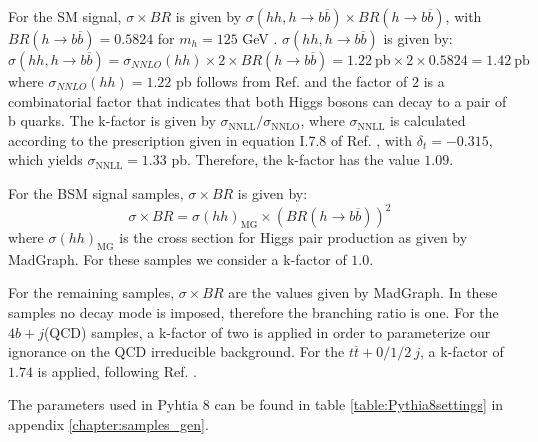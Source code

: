 For the SM signal, $\sigma\times BR$ is given by $\sigma(hh,h\rightarrow b\overline{b})\times BR(h\rightarrow b\overline{b})$, with $BR(h\rightarrow b\overline{b})=0.5824$ for $m_h=125$ GeV \cite{HiggsHandbook}. $\sigma(hh,h\rightarrow b\overline{b})$ is given by:
\begin{equation}
	\sigma(hh,h\rightarrow b\overline{b})=\sigma_{NNLO}(hh)\times 2\times BR(h\rightarrow b\overline{b})=1.22~\text{pb}\times 2 \times 0.5824 = 1.42 ~\text{pb}
\end{equation}
where $\sigma_{NNLO}(hh)=1.22$ pb follows from Ref. \cite{HxsNNLO} and the factor of $2$ is a combinatorial factor that indicates that both Higgs bosons can decay to a pair of b quarks. The k-factor is given by $\sigma_{\text{NNLL}}/\sigma_{\text{NNLO}}$, where $\sigma_{\text{NNLL}}$ is calculated according to the prescription given in equation I.7.8 of Ref. \cite{HiggsHandbook}, with $\delta_t=-0.315$, which yields $\sigma_{\text{NNLL}}=1.33$ pb. Therefore, the k-factor has the value $1.09$.

For the BSM signal samples, $\sigma\times BR$ is given by:
\begin{equation}
	\sigma\times BR = \sigma(hh)_{\text{MG}}\times (BR(h\rightarrow b\overline{b}))^2
\end{equation}
where $\sigma(hh)_{\text{MG}}$ is the cross section for Higgs pair production as given by MadGraph. For these samples we consider a k-factor of $1.0$.

For the remaining samples, $\sigma\times BR$ are the values given by MadGraph. In these samples no decay mode is imposed, therefore the branching ratio is one. For the $4b+j$(QCD) samples, a k-factor of two is applied \cite{FCCEventProducer} in order to parameterize our ignorance on the QCD irreducible background. For the $t\overline{t}+0/1/2 ~j$, a k-factor of $1.74$ is applied, following Ref. \cite{FCCEventProducer}.

The parameters used in Pyhtia 8 can be found in table \ref{table:Pythia8settings} in appendix \ref{chapter:samples_gen}.

